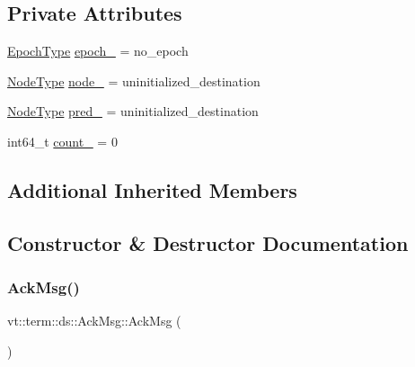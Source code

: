 \subsection*{Private Attributes}
\begin{DoxyCompactItemize}
\item 
\hyperlink{namespacevt_a81d11b28122d43bf9834577e4a06440f}{Epoch\+Type} \hyperlink{structvt_1_1term_1_1ds_1_1_ack_msg_a9e1108b90e8002c95195aea6165fba07}{epoch\+\_\+} = no\+\_\+epoch
\item 
\hyperlink{namespacevt_a866da9d0efc19c0a1ce79e9e492f47e2}{Node\+Type} \hyperlink{structvt_1_1term_1_1ds_1_1_ack_msg_aa50a9f95bfb4126740accbce33706760}{node\+\_\+} = uninitialized\+\_\+destination
\item 
\hyperlink{namespacevt_a866da9d0efc19c0a1ce79e9e492f47e2}{Node\+Type} \hyperlink{structvt_1_1term_1_1ds_1_1_ack_msg_a5371aca85f6cc60da48b9a9314fa02ca}{pred\+\_\+} = uninitialized\+\_\+destination
\item 
int64\+\_\+t \hyperlink{structvt_1_1term_1_1ds_1_1_ack_msg_ab973f14171a2e53dfd812c08407b6a51}{count\+\_\+} = 0
\end{DoxyCompactItemize}
\subsection*{Additional Inherited Members}


\subsection{Constructor \& Destructor Documentation}
\mbox{\label{structvt_1_1term_1_1ds_1_1_ack_msg_aa455e4d0c3e93b196e8fc21f576a5d3e}} 
\subsubsection{\texorpdfstring{Ack\+Msg()}{AckMsg()}\hspace{0.1cm}{\footnotesize\ttfamily [1/2]}}
{\footnotesize\ttfamily vt\+::term\+::ds\+::\+Ack\+Msg\+::\+Ack\+Msg (\begin{DoxyParamCaption}{ }\end{DoxyParamCaption})\hspace{0.3cm}{\ttfamily [default]}}

